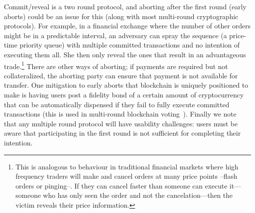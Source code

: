 Commit/reveal is a two round protocol, and aborting after the first round (early aborts) could be an issue for this (along with most multi-round cryptographic protocols). For example, in a financial exchange where the number of other orders might be in a predictable interval, an adversary can spray the sequence (\ie a price-time priority queue) with multiple committed transactions and no intention of executing them all. She then only reveal the ones that result in an advantageous trade.\footnote{This is analogous to behaviour in traditional financial markets where high frequency traders will make and cancel orders at many price points --flash orders or pinging--. If they can cancel faster than someone can execute it---someone who has only seen the order and not the cancelation---then the victim reveals their price information.} There are other ways of aborting; if payments are required but not collateralized, the aborting party can ensure that payment is not available for transfer. One mitigation to early aborts that blockchain is uniquely positioned to make is having users post a fidelity bond of a certain amount of cryptocurrency that can be automatically dispensed if they fail to fully execute committed transactions (this is used in multi-round blockchain voting~\cite{mccorry2017smart}). Finally we note that any multiple round protocol will have usability challenges: users must be aware that participating in the first round is not sufficient for completing their intention.



